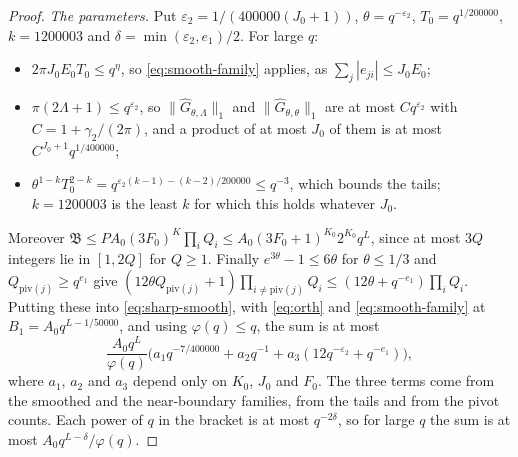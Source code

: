 \documentclass[11pt]{article}
\numberwithin{equation}{section}
\begin{document}
\begin{proof}
\emph{The parameters.} Put $\varepsilon_2 = 1/(400000(J_0 + 1))$, $\theta = q^{-\varepsilon_2}$, $T_0 = q^{1/200000}$,
$k = 1200003$ and $\delta = \min(\varepsilon_2, e_1)/2$. For large $q$:
\begin{itemize}
\item $2\pi J_0 E_0 T_0 \le q^{\eta}$, so \eqref{eq:smooth-family} applies, as $\sum_j |e_{ji}| \le J_0 E_0$;
\item $\pi(2\Lambda + 1) \le q^{\varepsilon_2}$, so $\|\hat G_{\theta, \Lambda}\|_1$ and $\|\hat G_{\theta, \theta}\|_1$
  are at most $C q^{\varepsilon_2}$ with $C = 1 + \gamma_2/(2\pi)$, and a product of at most $J_0$ of them is at most
  $C^{J_0 + 1} q^{1/400000}$;
\item $\theta^{1 - k} T_0^{2 - k} = q^{\varepsilon_2(k - 1) - (k - 2)/200000} \le q^{-3}$, which bounds the tails;
  $k = 1200003$ is the least $k$ for which this holds whatever $J_0$.
\end{itemize}
Moreover $\mathfrak B \le P A_0 (3F_0)^K \prod_i Q_i \le A_0
(3F_0 + 1)^{K_0} 2^{K_0} q^L$, since at most $3Q$ integers lie in $[1, 2Q]$ for $Q \ge 1$. Finally $e^{3\theta} - 1 \le
6\theta$ for $\theta \le 1/3$ and $Q_{\mathrm{piv}(j)} \ge q^{e_1}$ give $(12\theta Q_{\mathrm{piv}(j)} + 1) \prod_{i
\ne \mathrm{piv}(j)} Q_i \le (12\theta + q^{-e_1}) \prod_i Q_i$. Putting these into \eqref{eq:sharp-smooth}, with
\eqref{eq:orth} and \eqref{eq:smooth-family} at $B_1 = A_0 q^{L - 1/50000}$, and using $\varphi(q) \le q$, the sum is at
most
\[
  \frac{A_0 q^L}{\varphi(q)} \bigl(a_1 q^{-7/400000} + a_2 q^{-1} + a_3(12 q^{-\varepsilon_2} + q^{-e_1})\bigr),
\]
where $a_1$, $a_2$ and $a_3$ depend only on $K_0$, $J_0$ and $F_0$. The three terms come from the smoothed and the
near-boundary families, from the tails and from the pivot counts. Each power of $q$ in the bracket is at most
$q^{-2\delta}$, so for large $q$ the sum is at most $A_0 q^{L - \delta}/\varphi(q)$.
\end{proof}
\end{document}
